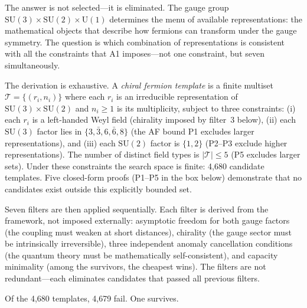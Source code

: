 \documentclass[11pt]{article}
\newcommand{\SU}{\mathrm{SU}}
\newcommand{\U}{\mathrm{U}}
\begin{document}
The answer is not selected---it is eliminated.  The gauge group $\SU(3) \times \SU(2) \times \U(1)$ determines the menu of available representations: the mathematical objects that describe how fermions can transform under the gauge symmetry.  The question is which combination of representations is consistent with all the constraints that A1 imposes---not one constraint, but seven simultaneously.

The derivation is exhaustive.  A \emph{chiral fermion template} is a finite multiset $\mathcal{T} = \{(r_i, n_i)\}$ where each $r_i$ is an irreducible representation of $\SU(3) \times \SU(2)$ and $n_i \ge 1$ is its multiplicity, subject to three constraints: (i) each $r_i$ is a left-handed Weyl field (chirality imposed by filter~3 below), (ii) each $\SU(3)$ factor lies in $\{3, \bar{3}, 6, \bar{6}, 8\}$ (the AF bound P1 excludes larger representations), and (iii) each $\SU(2)$ factor is $\{1, 2\}$ (P2--P3 exclude higher representations).  The number of distinct field types is $|\mathcal{T}| \le 5$ (P5 excludes larger sets).  Under these constraints the search space is finite: 4{,}680 candidate templates.  Five closed-form proofs (P1--P5 in the box below) demonstrate that no candidates exist outside this explicitly bounded set.

Seven filters are then applied sequentially.  Each filter is derived from the framework, not imposed externally: asymptotic freedom for both gauge factors (the coupling must weaken at short distances), chirality (the gauge sector must be intrinsically irreversible), three independent anomaly cancellation conditions (the quantum theory must be mathematically self-consistent), and capacity minimality (among the survivors, the cheapest wins).  The filters are not redundant---each eliminates candidates that passed all previous filters.

Of the 4{,}680 templates, 4{,}679 fail.  One survives.
\end{document}
